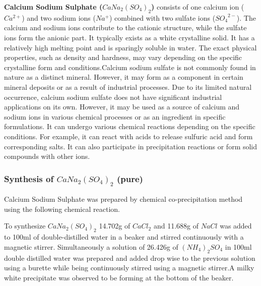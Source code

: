 \documentclass[../experiment.tex]{subfiles}
\begin{document}
    \textbf{Calcium Sodium Sulphate ($CaNa_2{(SO_4)}_2$)} consists of one calcium ion ($Ca^{2+}$) and two sodium 
    ions ($Na^+$) combined with two sulfate ions (${SO_4}^{2-}$). The calcium and sodium ions contribute to the 
    cationic structure, while the sulfate ions form the anionic part. It typically exists as a white crystalline 
    solid. It has a relatively high melting point and is sparingly soluble in water. The exact physical properties, 
    such as density and hardness, may vary depending on the specific crystalline form and conditions.Calcium 
    sodium sulfate is not commonly found in nature as a distinct mineral. However, it may form as a component in 
    certain mineral deposits or as a result of industrial processes. Due to its limited natural occurrence, 
    calcium sodium sulfate does not have significant industrial applications on its own. However, it may be used 
    as a source of calcium and sodium ions in various chemical processes or as an ingredient in specific 
    formulations. It can undergo various chemical reactions depending on the specific conditions. For example, it 
    can react with acids to release sulfuric acid and form corresponding salts. It can also participate in 
    precipitation reactions or form solid compounds with other ions.

    \subsubsection{Synthesis of $CaNa_2{(SO_4)}_2$ (pure)}
        Calcium Sodium Sulphate was prepared by chemical co-precipitation method\cite{a12}\cite{a13} using the following chemical reaction.
        \begin{center}
        \end{center}
        To synthesize $CaNa_2{(SO_4)}_2$ 14.702g of $CaCl_2$ and 11.688g of $NaCl$ was added to 100ml of double-distilled
        water in a beaker and stirred continuously with a magnetic stirrer. Simultaneously a solution of 26.426g of
        ${(NH_4)}_{2}SO_4$ in 100ml double distilled water was prepared and added drop wise to the previous solution using a
        burette while being continuously stirred using a magnetic stirrer.A milky white precipitate was observed to be
        forming at the bottom of the beaker.
\end{document}
